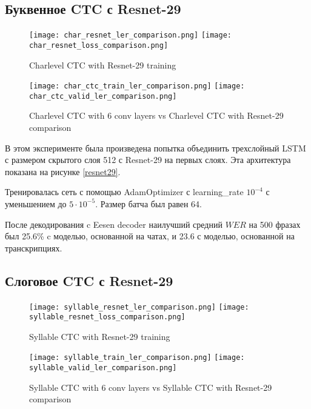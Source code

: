 \documentclass[a4paper,14pt]{extarticle}
\begin{document}
\iffalse
\begin{figure}[!h]
\texttt{[image: train\_ler\_comparison.png]}%
\texttt{[image: valid\_ler\_comparison.png]}
\texttt{[image: train\_loss\_comparison.png]}%
\texttt{[image: valid\_loss\_comparison.png]}
\caption{Syllable CTC vs Char CTC comparison}
\label{syllable_vs_char}
\end{figure}
\fi

\subsection{Буквенное CTC с Resnet-29}
\begin{figure}[!ht]
	\texttt{[image: char\_resnet\_ler\_comparison.png]}%
	\texttt{[image: char\_resnet\_loss\_comparison.png]}
	\caption{Charlevel CTC with Resnet-29 training}
	\label{char_resnet_train}
\end{figure}
\begin{figure}[!ht]
	\texttt{[image: char\_ctc\_train\_ler\_comparison.png]}%
	\texttt{[image: char\_ctc\_valid\_ler\_comparison.png]}
	\caption{Charlevel CTC with 6 conv layers vs Charlevel CTC with Resnet-29 comparison}
	\label{char_6conv_vs_resnet}
\end{figure}

В этом эксперименте была произведена попытка объединить трехслойный LSTM с размером скрытого слоя 512 с Resnet-29 \cite{resnet} \cite{asr_resnet} на первых слоях. Эта архитектура показана на рисунке \ref{resnet29}.

Тренировалась сеть с помощью AdamOptimizer с learning\_rate $10^{-4}$ с уменьшением до $5\cdot10^{-5}$. Размер батча был равен 64. 

После декодирования c Eesen decoder наилучший средний $WER$ на 500 фразах был 25.6\% c моделью, основанной на чатах, и 23.6 с моделью, основанной на транскрипциях.
\subsection{Слоговое CTC с Resnet-29}
\begin{figure}[!h]
	\texttt{[image: syllable\_resnet\_ler\_comparison.png]}%
	\texttt{[image: syllable\_resnet\_loss\_comparison.png]}
	\caption{Syllable CTC with Resnet-29 training}
	\label{syllable_resnet_train}
\end{figure}
\begin{figure}[!ht]
	\texttt{[image: syllable\_train\_ler\_comparison.png]}%
	\texttt{[image: syllable\_valid\_ler\_comparison.png]}
	\caption{Syllable CTC with 6 conv layers vs Syllable CTC with Resnet-29 comparison}
	\label{syllable_6conv_vs_resnet}
\end{figure}
\end{document}

